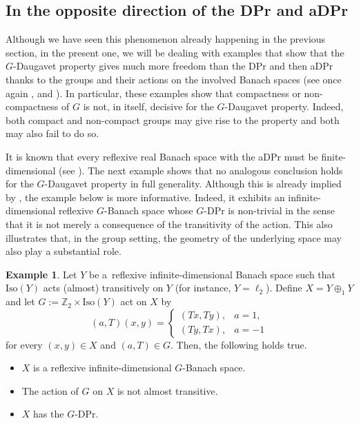 \documentclass[a4paper,12pt]{amsart}
\theoremstyle{definition}
\theoremstyle{definition}
\newtheorem{example}[theorem]{Example}
\theoremstyle{remark}
\numberwithin{equation}{section}
\newcommand{\Z}{\mathbb{Z}}
\newcommand{\Iso}{\mathrm{Iso}}
\newcommand{\<}{\langle}
\renewcommand{\>}{\rangle}
\begin{document}
	
	
	\subsection{In the opposite direction of the DPr and aDPr} Although we have seen this phenomenon already happening in the previous section, in the present one, we will be dealing with examples that show that the $G$-Daugavet property gives much more freedom than the DPr and then aDPr thanks to the groups and their actions on the involved Banach spaces (see once again ,  and ). In particular, these examples show that compactness or non-compactness of $G$ is not, in itself, decisive for the $G$-Daugavet property. Indeed, both compact and non-compact groups may give rise to the property and both may also fail to do so.
	
	
	
	It is known that every reflexive real Banach space with the aDPr must be finite-dimensional (see \cite{LMP1999}). The next example shows that no analogous conclusion holds for the $G$-Daugavet property in full generality. Although this is already implied by , the example below is more informative. Indeed, it exhibits an infinite-dimensional reflexive $G$-Banach space whose $G$-DPr is non-trivial in the sense that it is not merely a consequence of the transitivity of the action. This also illustrates that, in the group setting, the geometry of the underlying space may also play a substantial role.
	
	
	\begin{example} \label{inf-dim-reflexive-with-GDPr-not-almost-transitive}
		Let $Y$ be a~reflexive infinite-dimensional Banach space such that $\Iso(Y)$ acts (almost) transitively on $Y$ (for instance, $Y = \ell_2$). Define $X = Y \oplus_1 Y$ and let $G := \Z_2 \times \Iso(Y)$ act on $X$ by
		\begin{equation*}
			(a, T) (x, y)
			= \begin{cases}
				(T x, T y), & a = 1,\\
				(T y, T x), & a = -1
			\end{cases}
		\end{equation*}
		for every $(x,y) \in X$ and $(a,T) \in G$. Then, the following holds true.
		\begin{itemize}
			\item[(1)] $X$ is a reflexive infinite-dimensional $G$-Banach space.
			\item[(2)] The action of $G$ on $X$ is not almost transitive.
			\item[(3)] $X$ has the $G$-DPr.
		\end{itemize} 
	\end{example}
	
\end{document}
